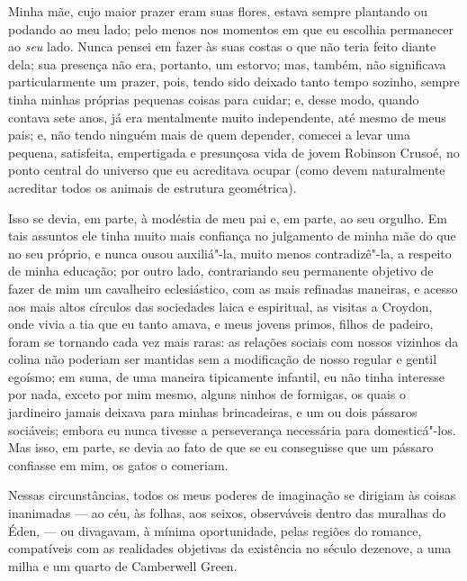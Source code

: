 Minha mãe, cujo maior prazer eram suas flores, estava sempre
plantando ou podando ao meu lado; pelo menos nos momentos em que eu
escolhia permanecer ao \textit{seu} lado. Nunca pensei em fazer às suas
costas o que não teria feito diante dela; sua presença não era,
portanto, um estorvo; mas, também, não significava particularmente um
prazer, pois, tendo sido deixado tanto tempo sozinho, sempre tinha
minhas próprias pequenas coisas para cuidar; e, desse modo, quando
contava sete anos, já era mentalmente muito independente, até mesmo de
meus pais; e, não tendo ninguém mais de quem depender, comecei a levar
uma pequena, satisfeita, empertigada e presunçosa vida de jovem Robinson
Crusoé, no ponto central do universo que eu acreditava ocupar (como
devem naturalmente acreditar todos os animais de estrutura geométrica).

Isso se devia, em parte, à modéstia de meu pai e, em parte, ao seu
orgulho. Em tais assuntos ele tinha muito mais confiança no julgamento
de minha mãe do que no seu próprio, e nunca ousou auxiliá"-la, muito
menos contradizê"-la, a respeito de minha educação; por outro lado,
contrariando seu permanente objetivo de fazer de mim um cavalheiro
eclesiástico, com as mais refinadas maneiras, e acesso aos mais altos
círculos das sociedades laica e espiritual, as visitas a Croydon, onde
vivia a tia que eu tanto amava, e meus jovens primos, filhos de padeiro,
foram se tornando cada vez mais raras: as relações sociais com nossos
vizinhos da colina não poderiam ser mantidas sem a modificação de nosso
regular e gentil egoísmo; em suma, de uma maneira tipicamente infantil,
eu não tinha interesse por nada, exceto por mim mesmo, alguns ninhos de
formigas, os quais o jardineiro jamais deixava para minhas brincadeiras,
e um ou dois pássaros sociáveis; embora eu nunca tivesse a perseverança
necessária para domesticá"-los. Mas isso, em parte, se devia ao fato de
que se eu conseguisse que um pássaro confiasse em mim, os gatos o
comeriam.

Nessas circunstâncias, todos os meus poderes de imaginação se dirigiam
às coisas inanimadas --- ao céu, às folhas, aos seixos, observáveis
dentro das muralhas do Éden, --- ou divagavam, à mínima oportunidade,
pelas regiões do romance, compatíveis com as realidades objetivas da
existência no século dezenove, a uma milha e um quarto de Camberwell
Green.

